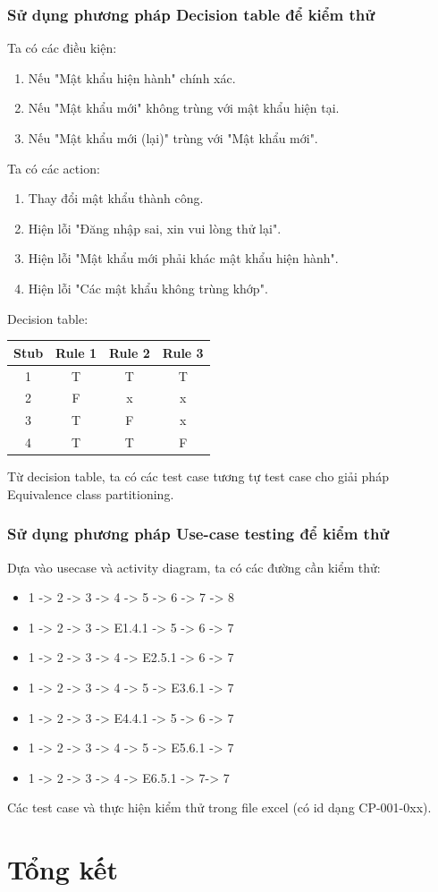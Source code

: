 \documentclass[a4paper, 12pt]{article}
\begin{document}
\subsubsection{Sử dụng phương pháp Decision table để kiểm thử}
Ta có các điều kiện:
\begin{enumerate}
    \item Nếu "Mật khẩu hiện hành" chính xác.
    \item Nếu "Mật khẩu mới" không trùng với mật khẩu hiện tại.
    \item Nếu "Mật khẩu mới (lại)" trùng với "Mật khẩu mới".
\end{enumerate}
Ta có các action:
\begin{enumerate}
    \item Thay đổi mật khẩu thành công.
    \item Hiện lỗi "Đăng nhập sai, xin vui lòng thử lại".
    \item Hiện lỗi "Mật khẩu mới phải khác mật khẩu hiện hành".
    \item Hiện lỗi "Các mật khẩu không trùng khớp".
\end{enumerate}
Decision table:
\begin{table}[H]
    \centering
    \begin{tabular}{|c|c|c|c|}
        \hline
        Stub & Rule 1 & Rule 2 & Rule 3 \\
        \hline
        1 & T & T & T \\
        \hline
        2 & F & x & x \\
        \hline
        3 & T & F & x \\
        \hline
        4 & T & T & F \\
        \hline
    \end{tabular}
    \label{tab:my_label}
\end{table}
Từ decision table, ta có các test case tương tự test case cho giải pháp Equivalence class partitioning.
\subsubsection{Sử dụng phương pháp Use-case testing để kiểm thử}
Dựa vào usecase và activity diagram, ta có các đường cần kiểm thử:
\begin{itemize}
    \item 1 -> 2 -> 3 -> 4 -> 5 -> 6 -> 7 -> 8
    \item 1 -> 2 -> 3 -> E1.4.1 -> 5 -> 6 -> 7
    \item 1 -> 2 -> 3 -> 4 -> E2.5.1 -> 6 -> 7
    \item 1 -> 2 -> 3 -> 4 -> 5 -> E3.6.1 -> 7
    \item 1 -> 2 -> 3 -> E4.4.1 -> 5 -> 6 -> 7
    \item 1 -> 2 -> 3 -> 4 -> 5 -> E5.6.1 -> 7
    \item 1 -> 2 -> 3 -> 4 -> E6.5.1 -> 7-> 7
\end{itemize}
Các test case và thực hiện kiểm thử trong file excel (có id dạng CP-001-0xx).
\section{Tổng kết}
\end{document}
